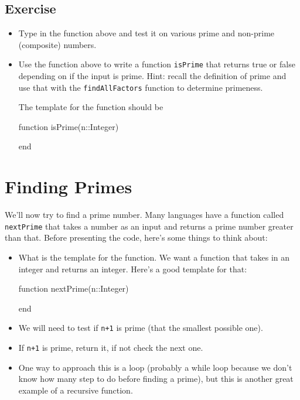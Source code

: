\subsection{Exercise}

\begin{itemize}
\item Type in the function above and test it on various prime and non-prime (composite) numbers. 
\item Use the function above to write a function \texttt{isPrime} that returns true or false depending on if the input is prime. Hint: recall the definition of prime and use that with the \verb!findAllFactors! function to determine primeness.

  The template for the function should be

\begin{jlblock}[nt]
function isPrime(n::Integer)

end
\end{jlblock}
\end{itemize}


\section{Finding Primes}

We'll now try to find a prime number. Many languages have a function
called \texttt{nextPrime} that takes a number as an input and returns
a prime number greater than that.  Before presenting the code, here's some things to think about:

\begin{itemize}
\item What is the template for the function.  We want a function that takes in an integer and returns an integer.  Here's a good template for that: 
\begin{jlblock}[nt]
function nextPrime(n::Integer)

end
\end{jlblock}

\item We will need to test if \texttt{n+1} is prime (that the smallest possible one).
\item If \texttt{n+1} is prime, return it, if not check the next one. 
\item One way to approach this is a loop (probably a while loop because we don't know how many step to do before finding a prime), but this is another great example of a recursive function.  
\end{itemize}

